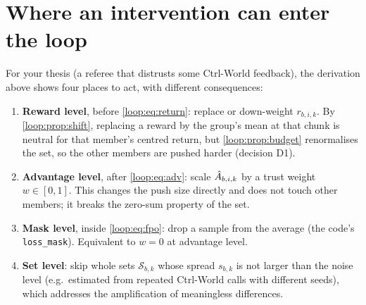 \section{Where an intervention can enter the loop}
For your thesis (a referee that distrusts some Ctrl-World feedback), the derivation above shows four places to act, with different consequences:
\begin{enumerate}
\item \textbf{Reward level}, before \eqref{loop:eq:return}: replace or down-weight $r_{b,i,k}$. By \cref{loop:prop:shift}, replacing a reward by the group's mean at that chunk is neutral for that member's centred return, but \cref{loop:prop:budget} renormalises the set, so the other members are pushed harder (decision D1).
\item \textbf{Advantage level}, after \eqref{loop:eq:adv}: scale $\hat A_{b,i,k}$ by a trust weight $w\in[0,1]$. This changes the push size directly and does not touch other members; it breaks the zero-sum property of the set.
\item \textbf{Mask level}, inside \eqref{loop:eq:fpo}: drop a sample from the average (the code's \texttt{loss\_mask}). Equivalent to $w=0$ at advantage level.
\item \textbf{Set level}: skip whole sets $\mathcal S_{b,k}$ whose spread $s_{b,k}$ is not larger than the noise level (e.g.\ estimated from repeated Ctrl-World calls with different seeds), which addresses the amplification of meaningless differences.
\end{enumerate}


